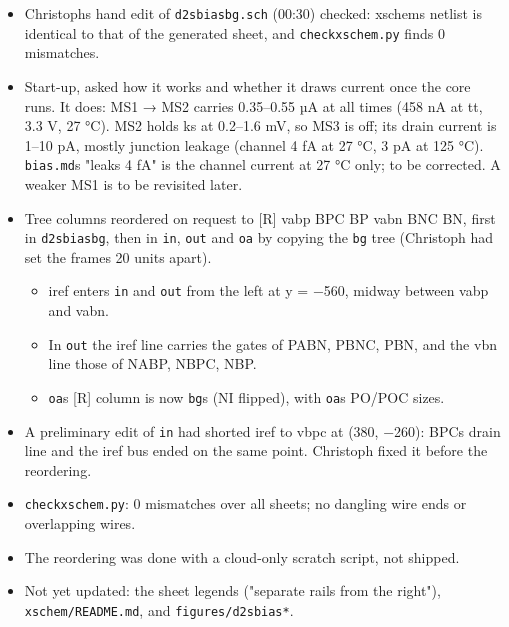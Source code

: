 \documentclass[11pt,a4paper]{article}
\providecommand{\tightlist}{\setlength{\itemsep}{0pt}\setlength{\parskip}{0pt}}
\renewcommand{\_}{\textunderscore\hspace{0pt}}
\begin{document}
\begin{itemize}
\tightlist
\item
  Christoph\textquotesingle s hand edit of
  \texttt{d2s\_bias\_bg.sch} (00:30) checked:
  xschem\textquotesingle s netlist is identical to
  that of the generated sheet, and
  \texttt{check\_xschem.py} finds 0 mismatches.
\item
  Start-up, asked how it works and whether it
  draws current once the core runs. It does: MS1 →
  MS2 carries 0.35--0.55 µA at all times (458 nA
  at tt, 3.3 V, 27 °C). MS2 holds ks at 0.2--1.6
  mV, so MS3 is off; its drain current is 1--10
  pA, mostly junction leakage (channel 4 fA at 27
  °C, 3 pA at 125 °C).
  \texttt{bias.md}\textquotesingle s "leaks 4 fA"
  is the channel current at 27 °C only; to be
  corrected. A weaker MS1 is to be revisited
  later.
\item
  Tree columns reordered on request to {[}R{]}
  \textbar{} vabp BPC BP \textbar{} vabn BNC BN,
  first in \texttt{d2s\_bias\_bg}, then in
  \texttt{\_in}, \texttt{\_out} and \texttt{\_oa}
  by copying the \texttt{\_bg} tree (Christoph had
  set the frames 20 units apart).

  \begin{itemize}
  \tightlist
  \item
    iref enters \texttt{\_in} and \texttt{\_out}
    from the left at y = −560, midway between vabp
    and vabn.
  \item
    In \texttt{\_out} the iref line carries the
    gates of PABN, PBNC, PBN, and the vbn line
    those of NABP, NBPC, NBP.
  \item
    \texttt{\_oa}\textquotesingle s {[}R{]} column
    is now \texttt{\_bg}\textquotesingle s (NI
    flipped), with \texttt{\_oa}\textquotesingle s
    PO/POC sizes.
  \end{itemize}
\item
  A preliminary edit of \texttt{\_in} had shorted
  iref to vbpc at (380, −260):
  BPC\textquotesingle s drain line and the iref
  bus ended on the same point. Christoph fixed it
  before the reordering.
\item
  \texttt{check\_xschem.py}: 0 mismatches over all
  sheets; no dangling wire ends or overlapping
  wires.
\item
  The reordering was done with a cloud-only
  scratch script, not shipped.
\item
  Not yet updated: the sheet legends ("separate
  rails from the right"),
  \texttt{xschem/README.md}, and
  \texttt{figures/d2s\_bias\_*}.
\end{itemize}
\end{document}
